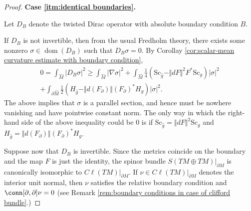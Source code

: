 \documentclass[12pt, reqno]{amsart}
\theoremstyle{plain} %
\theoremstyle{definition}
\theoremstyle{remark}
\numberwithin{equation}{section}
\newcommand{\dom}[1]{\hat{#1}}
\newcommand{\onorm}[1]{\Vert #1 \Vert}
\newcommand{\pnorm}[1]{| #1 |}
\newcommand{\bnd}[1]{\partial #1}
\newcommand{\Sc}{\mathrm{Sc}}
\newcommand{\Cl}{C\ell}
\DeclareMathOperator{\operdom}{dom}
\begin{document}
\begin{proof}
    \textbf{Case \ref{itm:identical boundaries}.}

    Let \(D_B\) denote the twisted Dirac operator with absolute boundary condition \(B\).

    If \(D_B\) is not invertible, then from the usual Fredholm theory, there exists some nonzero \(\sigma \in \operdom(D_B)\) such that \(D_B \sigma = 0\).
    By Corollay \ref{cor:scalar-mean curvature estimate with boundary condition},
    \begin{multline*}
        0 = \int_{\dom{M}} \pnorm{D_B \sigma}^2 \geq \int_{\dom{M}} \pnorm{\nabla \sigma}^2 + \int_{\dom{M}} \frac{1}{4}(\Sc_{\dom{g}} - \onorm{dF}^2 F^*\Sc_g) \pnorm{\sigma}^2\\
        + \int_{ \bnd{\dom{M}} } \frac{1}{2}(H_{\dom{g}} - \onorm{d(F_\partial)} (F_\partial)^*H_g)\pnorm{\sigma}^2.
    \end{multline*}
    The above implies that \(\sigma\) is a parallel section, and hence must be nowhere vanishing and have pointwise constant norm.
    The only way in which the right-hand side of the above inequality could be 0 is if \(\Sc_{\dom{g}} = \onorm{dF}^2 \Sc_g\) and \(H_{\dom{g}} = \onorm{d(F_\partial)} (F_\partial)^*H_g\).

    Suppose now that \(D_B\) is invertible.
    Since the metrics coincide on the boundary and the map \(F\) is just the identity, the spinor bundle \(S(TM \oplus TM)|_{\bnd{M}}\) is canonically isomorphic to \(\Cl(TM)|_{\bnd{M}}\).
    If \(\nu \in \Cl(TM)|_{\bnd{M}}\) denotes the interior unit normal, then \(\nu\) satisfies the relative boundary condition and \(\conn[\partial, \partial] \nu = 0\) (see Remark \ref{rem:boundary conditions in case of clifford bundle}.)


\end{proof}
\end{document}
